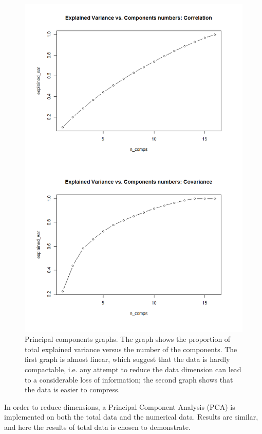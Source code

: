 \documentclass{article}
\begin{document}
\begin{figure}[ht]
\vskip 0.2in
\begin{center}
\centerline{\includegraphics[width=\columnwidth]{pca_graph_cor_cov}}
\caption{Principal components graphs. The graph shows the proportion of total explained variance versus the number of the components. The first graph is almost linear, which suggest that the data is hardly compactable, i.e. any attempt to reduce the data dimension can lead to a considerable loss of information; the second graph shows that the data is easier to compress.}
\label{fig3}
\end{center}
\vskip -0.2in
\end{figure}

In order to reduce dimensions, a Principal Component Analysis (PCA) is implemented on both the total data and the numerical data. Results are similar, and here the results of total data is chosen to demonstrate.
\end{document}
